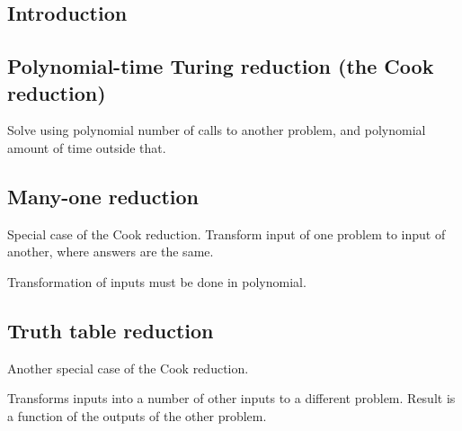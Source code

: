
\subsection{Introduction}

\subsection{Polynomial-time Turing reduction (the Cook reduction)}

Solve using polynomial number of calls to another problem, and polynomial amount of time outside that.

\subsection{Many-one reduction}

Special case of the Cook reduction. Transform input of one problem to input of another, where answers are the same.

Transformation of inputs must be done in polynomial.

\subsection{Truth table reduction}

Another special case of the Cook reduction. 

Transforms inputs into a number of other inputs to a different problem. Result is a function of the outputs of the other problem.
